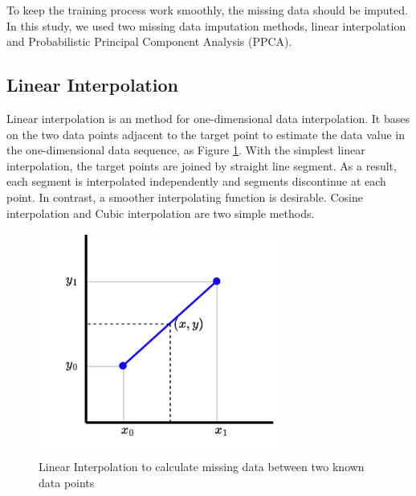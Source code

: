 \documentclass[12pt,a4paper,english
]{tunithesis}
\begin{document}
To keep the training process work smoothly, the missing data should be imputed. In this study, we used two missing data imputation methods, linear interpolation and Probabilistic Principal Component Analysis (PPCA).

\subsection{Linear Interpolation}
Linear interpolation is an method for one-dimensional data interpolation. It bases on the two data points adjacent to the target point to estimate the data value in the one-dimensional data sequence, as Figure \ref{fig:linear_impute_fig}. With the simplest linear interpolation, the target points are joined by straight line segment. As a result, each segment is interpolated independently and segments discontinue at each point. \parencite{huang2021, paul1999}
In contrast, a smoother interpolating function is desirable. Cosine interpolation and Cubic interpolation are two simple methods.

\begin{figure}
  \begin{center}
    \includegraphics[width=0.7\textwidth]{thesis/img/linear_impute.pdf}
  \end{center}
  \caption[Linear Interpolation]{Linear Interpolation to calculate missing data between two known data points}
  \label{fig:linear_impute_fig}
\end{figure}
\end{document}

